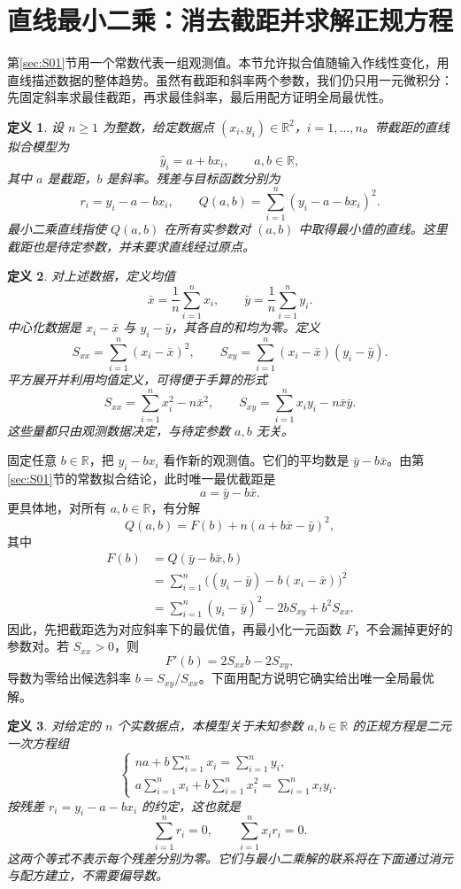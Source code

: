 \documentclass[UTF8,fontset=fandol,11pt]{ctexart}
\newtheorem{definition}{定义}[section]
\begin{document}
\section{直线最小二乘：消去截距并求解正规方程}\label{sec:S02}
第\ref{sec:S01}节用一个常数代表一组观测值。本节允许拟合值随输入作线性变化，用直线描述数据的整体趋势。虽然有截距和斜率两个参数，我们仍只用一元微积分：先固定斜率求最佳截距，再求最佳斜率，最后用配方证明全局最优性。\par
\begin{definition}
设 $n\geq1$ 为整数，给定数据点 $(x_i,y_i)\in\mathbb{R}^2$，$i=1,\ldots,n$。带截距的直线拟合模型为
\[
\hat{y}_i=a+bx_i,\qquad a,b\in\mathbb{R},
\]
其中 $a$ 是截距，$b$ 是斜率。残差与目标函数分别为
\[
r_i=y_i-a-bx_i,\qquad
Q(a,b)=\sum_{i=1}^{n}(y_i-a-bx_i)^2.
\]
最小二乘直线指使 $Q(a,b)$ 在所有实参数对 $(a,b)$ 中取得最小值的直线。这里截距也是待定参数，并未要求直线经过原点。
\end{definition}
\begin{definition}
对上述数据，定义均值
\[
\bar{x}=\frac1n\sum_{i=1}^{n}x_i,\qquad
\bar{y}=\frac1n\sum_{i=1}^{n}y_i.
\]
中心化数据是 $x_i-\bar{x}$ 与 $y_i-\bar{y}$，其各自的和均为零。定义
\[
S_{xx}=\sum_{i=1}^{n}(x_i-\bar{x})^2,\qquad
S_{xy}=\sum_{i=1}^{n}(x_i-\bar{x})(y_i-\bar{y}).
\]
平方展开并利用均值定义，可得便于手算的形式
\[
S_{xx}=\sum_{i=1}^{n}x_i^2-n\bar{x}^2,\qquad
S_{xy}=\sum_{i=1}^{n}x_i y_i-n\bar{x}\bar{y}.
\]
这些量都只由观测数据决定，与待定参数 $a,b$ 无关。
\end{definition}
固定任意 $b\in\mathbb{R}$，把 $y_i-bx_i$ 看作新的观测值。它们的平均数是 $\bar{y}-b\bar{x}$。由第\ref{sec:S01}节的常数拟合结论，此时唯一最优截距是
\[
a=\bar{y}-b\bar{x}.
\]
更具体地，对所有 $a,b\in\mathbb{R}$，有分解
\[
Q(a,b)=F(b)+n(a+b\bar{x}-\bar{y})^2,
\]
其中
\[
\begin{aligned}
F(b)&=Q(\bar{y}-b\bar{x},b)\\
&=\sum_{i=1}^{n}\bigl((y_i-\bar{y})-b(x_i-\bar{x})\bigr)^2\\
&=\sum_{i=1}^{n}(y_i-\bar{y})^2-2bS_{xy}+b^2S_{xx}.
\end{aligned}
\]
因此，先把截距选为对应斜率下的最优值，再最小化一元函数 $F$，不会漏掉更好的参数对。若 $S_{xx}>0$，则
\[
F'(b)=2S_{xx}b-2S_{xy},
\]
导数为零给出候选斜率 $b=S_{xy}/S_{xx}$。下面用配方说明它确实给出唯一全局最优解。\par
\begin{definition}
对给定的 $n$ 个实数据点，本模型关于未知参数 $a,b\in\mathbb{R}$ 的正规方程是二元一次方程组
\[
\begin{cases}
na+b\displaystyle\sum_{i=1}^{n}x_i=\displaystyle\sum_{i=1}^{n}y_i,\\
a\displaystyle\sum_{i=1}^{n}x_i+b\displaystyle\sum_{i=1}^{n}x_i^2=\displaystyle\sum_{i=1}^{n}x_i y_i.
\end{cases}
\]
按残差 $r_i=y_i-a-bx_i$ 的约定，这也就是
\[
\sum_{i=1}^{n}r_i=0,\qquad \sum_{i=1}^{n}x_i r_i=0.
\]
这两个等式不表示每个残差分别为零。它们与最小二乘解的联系将在下面通过消元与配方建立，不需要偏导数。
\end{definition}
\end{document}
